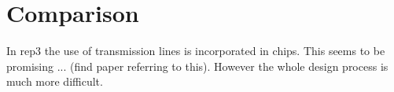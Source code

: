 \section{Comparison}

In rep3 the use of transmission lines is incorporated in chips. 
This seems to be promising ... (find paper referring to this).
However the whole design process is much more difficult.
